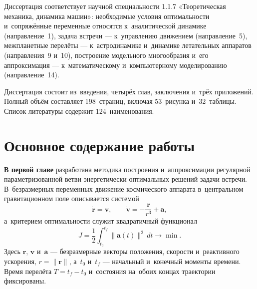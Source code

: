 Диссертация соответствует научной специальности 1.1.7 «Теоретическая механика, динамика машин»: необходимые условия оптимальности и~сопряжённые переменные относятся к~аналитической динамике (направление~1), задача встречи --- к~управлению движением (направление~5), межпланетные перелёты --- к~астродинамике и~динамике летательных аппаратов (направления~9 и~10), построение модельного многообразия и~его аппроксимация --- к~математическому и~компьютерному моделированию (направление~14).

Диссертация состоит из~введения, четырёх глав, заключения и~трёх приложений. Полный объём составляет 198~страниц, включая 53~рисунка и~32~таблицы. Список литературы содержит 124~наименования.

\section*{Основное содержание работы}

\noindent\textbf{В первой главе} разработана методика построения и~аппроксимации регулярной параметризованной ветви энергетически оптимальных решений задачи встречи. В~безразмерных переменных движение космического аппарата в~центральном гравитационном поле описывается системой
\begin{equation}
    \dot{\mathbf r}=\mathbf v,
    \qquad
    \dot{\mathbf v}=-\frac{\mathbf r}{r^3}+\mathbf a,
    \label{eq:syn-motion}
\end{equation}
а~критерием оптимальности служит квадратичный функционал
\begin{equation}
    J=\frac12\int_{t_0}^{t_f}\lVert\mathbf a(t)\rVert^2\,dt\longrightarrow\min.
    \label{eq:syn-functional}
\end{equation}
Здесь $\mathbf r$, $\mathbf v$ и~$\mathbf a$ --- безразмерные векторы положения, скорости и~реактивного ускорения, $r=\lVert\mathbf r\rVert$, а~$t_0$ и~$t_f$ --- начальный и~конечный моменты времени. Время перелёта $T=t_f-t_0$ и~состояния на~обоих концах траектории фиксированы.

